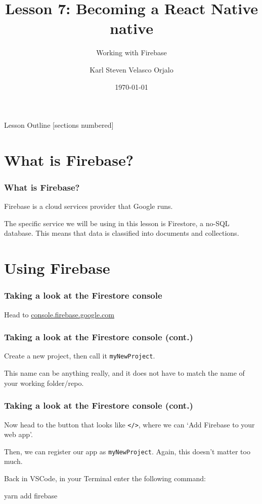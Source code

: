 \documentclass{beamer}
\title{Lesson 7: Becoming a React Native native}
\subtitle{Working with Firebase}
\date{\today}
\author{Karl Steven Velasco Orjalo}
\institute{React Native Quickstart}
\begin{document}
  \maketitle

  \begin{frame}{Lesson Outline}
    [sections numbered]
    \tableofcontents
  \end{frame}

  \section{What is Firebase?}
  \begin{frame}[fragile]
    \frametitle{What is Firebase?}
    Firebase is a cloud services provider that Google runs. 

    The specific service we will be using in this lesson is Firestore, a no-SQL database. 
    This means that data is classified into documents and collections. 
  \end{frame}

  \section{Using Firebase}
  \begin{frame}[fragile]
    \frametitle{Taking a look at the Firestore console}
    Head to \url{console.firebase.google.com}
  \end{frame}

  \begin{frame}[fragile]
    \frametitle{Taking a look at the Firestore console (cont.)}
    Create a new project, then call it \verb|myNewProject|. 

    This name can be anything really, and it does not have to match the name of your working folder/repo.
  \end{frame}

  \begin{frame}[fragile]
    \frametitle{Taking a look at the Firestore console (cont.)}
    Now head to the button that looks like \verb|</>|, where we can `Add Firebase to your web app'. 

    Then, we can register our app as \verb|myNewProject|. Again, this doesn't matter too much. 

    Back in VSCode, in your Terminal enter the following command: 

    \begin{bashcode}
yarn add firebase
    \end{bashcode}
  \end{frame}
\end{document}
